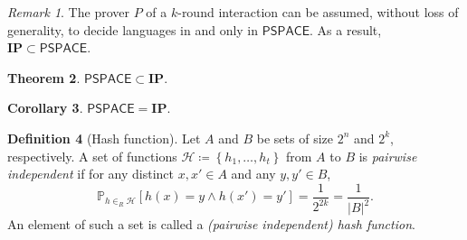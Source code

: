 \documentclass[10pt,letterpaper,cm]{nupset}
\theoremstyle{definition}
\newtheorem{definition}{Definition}[subsection]
\theoremstyle{theorem}
\newtheorem{theorem}[definition]{Theorem}
\newtheorem{corollary}[definition]{Corollary}
\theoremstyle{remark}
\newtheorem{remark}[definition]{Remark}
\renewcommand{\H}{\mathcal H}
\newcommand{\1}{\mathbf{1}}
\newcommand{\0}{\vec 0}
\begin{document}
\begin{remark}
The prover $P$ of a $k$-round interaction can be assumed, without loss of generality, to decide languages in and only in $\mathsf{PSPACE}$. As a result, $\mathbf{IP} \subset \mathsf{PSPACE}$.
\end{remark}

\begin{theorem}
$\mathsf{PSPACE} \subset \mathbf{IP}$.
\end{theorem}

\begin{corollary}
$\mathsf{PSPACE} = \mathbf{IP}$.
\end{corollary}

\bigskip

\begin{definition}[Hash function]
Let $A$ and $B$ be sets of size $2^n$ and $2^k$, respectively. A set of functions $\H\coloneqq \left\{h_1, \ldots, h_t\right\}$ from $A$ to $B$ is \textit{pairwise independent} if for any distinct $x, x' \in A$ and any $y, y' \in B$, $$  \mathbb{P}_{h \in_R \H}\left[h(x) = y \land h(x') = y'\right] = \frac{1}{2^{2k}}  = \frac{1}{\left\lvert{B}\right\rvert^2}.$$ An element of such a set is called a \textit{(pairwise independent) hash function}.
\end{definition}
\end{document}

